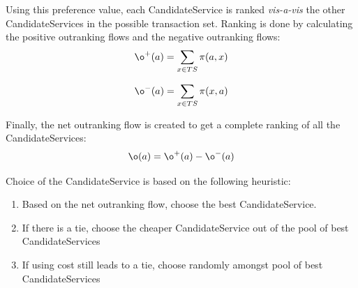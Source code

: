 \documentclass[10pt,journal,compsoc]{IEEEtran}
\begin{document}
Using this preference value, each CandidateService is ranked \textit{vis-a-vis} the other CandidateServices in the possible transaction set. Ranking is done by calculating the positive outranking flows and the negative outranking flows:
\begin{equation}
\o^{+}(a) = \sum_{x \in TS}\pi(a,x)
\label{positive_outranking}
\end{equation}

\begin{equation}
\o^{-}(a) = \sum_{x \in TS}\pi(x,a)
\label{negative_outranking}
\end{equation}

Finally, the net outranking flow is created to get a complete ranking of all the CandidateServices:
\begin{equation}
\o(a) = \o^{+}(a) - \o^{-}(a)
\label{net_outranking}
\end{equation}

Choice of the CandidateService is based on the following heuristic:
	\begin{enumerate}
		\item Based on the net outranking flow, choose the best CandidateService. 
		\item If there is a tie, choose the cheaper CandidateService out of the pool of best CandidateServices
		\item If using cost still leads to a tie, choose randomly amongst pool of best CandidateServices
	\end{enumerate}
\end{document}
